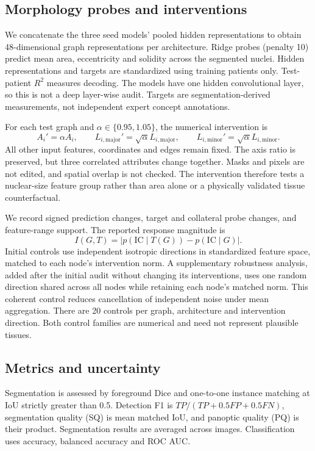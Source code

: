 \documentclass[11pt,a4paper]{article}
\begin{document}
\subsection{Morphology probes and interventions}
We concatenate the three seed models' pooled hidden representations to obtain 48-dimensional graph representations per architecture. Ridge probes (penalty 10) predict mean area, eccentricity and solidity across the segmented nuclei. Hidden representations and targets are standardized using training patients only. Test-patient $R^2$ measures decoding. The models have one hidden convolutional layer, so this is not a deep layer-wise audit. Targets are segmentation-derived measurements, not independent expert concept annotations.

For each test graph and $\alpha\in\{0.95,1.05\}$, the numerical intervention is
\begin{equation}
A_i'=\alpha A_i,\qquad L_{i,\mathrm{major}}'=\sqrt{\alpha}L_{i,\mathrm{major}},\qquad
L_{i,\mathrm{minor}}'=\sqrt{\alpha}L_{i,\mathrm{minor}}.
\end{equation}
All other input features, coordinates and edges remain fixed. The axis ratio is preserved, but three correlated attributes change together. Masks and pixels are not edited, and spatial overlap is not checked. The intervention therefore tests a nuclear-size feature group rather than area alone or a physically validated tissue counterfactual.

We record signed prediction changes, target and collateral probe changes, and feature-range support. The reported response magnitude is
\begin{equation}
I(G,T)=\left|p(\mathrm{IC}\mid T(G))-p(\mathrm{IC}\mid G)\right|.
\end{equation}
Initial controls use independent isotropic directions in standardized feature space, matched to each node's intervention norm. A supplementary robustness analysis, added after the initial audit without changing its interventions, uses one random direction shared across all nodes while retaining each node's matched norm. This coherent control reduces cancellation of independent noise under mean aggregation. There are 20 controls per graph, architecture and intervention direction. Both control families are numerical and need not represent plausible tissues.

\subsection{Metrics and uncertainty}
Segmentation is assessed by foreground Dice and one-to-one instance matching at IoU strictly greater than 0.5. Detection F1 is $TP/(TP+0.5FP+0.5FN)$, segmentation quality (SQ) is mean matched IoU, and panoptic quality (PQ) is their product. Segmentation results are averaged across images. Classification uses accuracy, balanced accuracy and ROC AUC.
\end{document}
